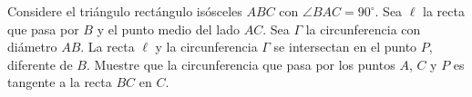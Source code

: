 Considere el triángulo rectángulo isósceles $ABC$ con $\angle BAC = 90^{\circ}$. Sea $\ell$ la recta que pasa por $B$ y el punto medio del lado $AC$. Sea $\Gamma$ la circunferencia con diámetro $AB$. La recta $\ell$ y la circunferencia $\Gamma$ se intersectan en el punto $P$, diferente de $B$. Muestre que la circunferencia que pasa por los puntos $A$, $C$ y $P$ es tangente a la recta $BC$ en $C$.